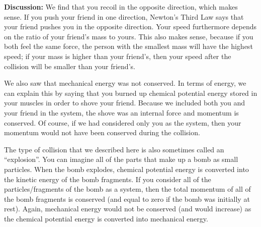 \begin{example}
\textbf{Discussion:} We find that you recoil in the opposite direction, which makes sense. If you push your friend in one direction, Newton's Third Law says that your friend pushes you in the opposite direction. Your speed furthermore depends on the ratio of your friend's mass to yours. This also makes sense, because if you both feel the same force, the person with the smallest mass will have the highest speed; if your mass is higher than your friend's, then your speed after the collision will be smaller than your friend's.

We also saw that mechanical energy was not conserved. In terms of energy, we can explain this by saying that you burned up chemical potential energy stored in your muscles in order to shove your friend. Because we included both you and your friend in the system, the shove was an internal force and momentum is conserved. Of course, if we had considered only you as the system, then your momentum would not have been conserved during the collision. 

The type of collision that we described here is also sometimes called an ``explosion''. You can imagine all of the parts that make up a bomb as small particles. When the bomb explodes, chemical potential energy is converted into the kinetic energy of the bomb fragments. If you consider all of the particles/fragments of the bomb as a system, then the total momentum of all of the bomb fragments is conserved (and equal to zero if the bomb was initially at rest). Again, mechanical energy would not be conserved (and would increase) as the chemical potential energy is converted into mechanical energy.
\end{example}

